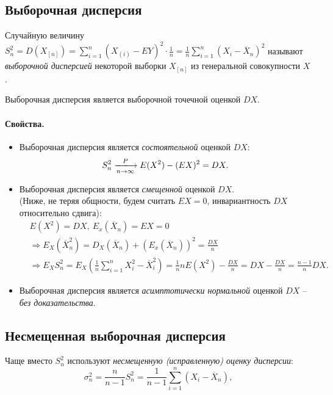 \subsection{Выборочная дисперсия}

\begin{definition}
  Случайную величину $S^2_n = D(X_{[n]}) =
  \sum\limits_{i = 1}^{n} (X_{(i)} - EY)^2 \cdot \frac{1}{n} =
  \frac{1}{n} \sum\limits_{i = 1}^{n}(X_i - \overline{X}_n)^2$ называют
  \textit{выборочной дисперсией} некоторой выборки $X_{[n]}$ из генеральной
  совокупности $X$.
\end{definition}

Выборочная дисперсия является выборочной точечной оценкой $DX$.

\paragraph{Свойства.}
\begin{itemize}
  \item Выборочная дисперсия является \textit{состоятельной} оценкой $DX$:
  \[
    S^2_n \xlongrightarrow[n \to \infty]{P} E(X^2) - (EX)^2 = DX
  .\]

  \item Выборочная дисперсия является \textit{смещенной} оценкой $DX$.\\
  (Ниже, не теряя общности, будем считать $EX = 0$, инвариантность $DX$
  относительно сдвига):
  \begin{align*}
    &E(X^2) = DX,~ E_x(\overline{X}_n) = EX = 0\\
    &\Rightarrow E_X(\overline{X}^2_n) =
    D_X(\overline{X}_n) + (E_x(\overline{X}_n))^2 = \frac{DX}{n}\\
    &\Rightarrow E_X S^2_n =
    E_X(\frac{1}{n} \sum\limits_{i = 1}^{n} X^2_i - \overline{X}^2_i) =
    \frac{1}{n} n E(X^2) - \frac{DX}{n} = DX - \frac{DX}{n} =
    \frac{n - 1}{n} DX
  .\end{align*}

  \item Выборочная дисперсия является \textit{асимптотически нормальной}
  оценкой $DX$ -- \textit{без доказательства}.
\end{itemize}



\subsection{Несмещенная выборочная дисперсия}
\begin{definition}
  Чаще вместо $S^2_n$ используют \textit{несмещенную (исправленную) оценку
  дисперсии}:
  \[
    \sigma^2_n = \frac{n}{n - 1} S^2_n =
    \frac{1}{n - 1} \sum\limits_{i = 1}^{n} (X_i - \overline{X}_n)
  ,\]
\end{definition}

